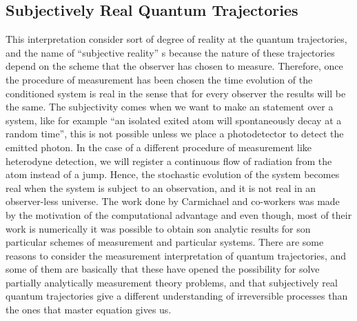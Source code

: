 \subsection*{Subjectively Real Quantum Trajectories}
This interpretation consider sort of degree of reality at the quantum trajectories, and the name of ``subjective reality'' s because the nature of these trajectories depend on the scheme that the observer has chosen to measure. Therefore, once the procedure of measurement has been chosen the time evolution of the conditioned system is real in the sense that for every observer the results will be the same. The subjectivity comes when we want to make an statement over a system, like for example ``an isolated exited atom will spontaneously decay at a random time'', this is not possible unless we place a photodetector to detect the emitted photon. In the case of a different procedure of measurement like heterodyne detection, we will register a continuous flow of radiation from the atom instead of a jump. Hence, the stochastic evolution of the system becomes real when the system is subject to an observation, and it is not real in an observer-less universe. 
The work done by Carmichael and co-workers \cite{Carmichaelquantum,PhysRevLett.70.2273,PhysRevLett.75.45,PhysRevA.46.R6801,Carmichael1994} was made by the motivation of the computational advantage and even though, most of their work is numerically it was possible to obtain son analytic results for son particular schemes of measurement and particular systems. There are some reasons to consider the measurement interpretation of quantum trajectories, and some of them are basically that these have opened the possibility for solve partially analytically measurement theory problems, and that subjectively real quantum trajectories give a different understanding of irreversible processes than the ones that master equation gives us.
